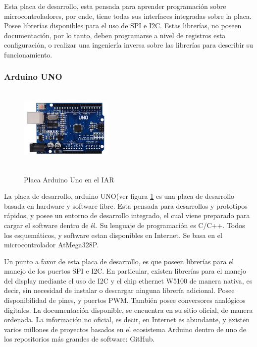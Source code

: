 Esta placa de desarrollo, esta pensada para aprender programación sobre microcontroladores, por ende, tiene todas sus interfaces integradas sobre la placa. Posee librerías disponibles para el uso de SPI e I2C. Estas librerías, no poseen documentación, por lo tanto, deben programarse a nivel de registros esta configuración, o realizar una ingeniería inversa sobre las librerías para describir su funcionamiento.    
\vspace{-3mm}

\subsubsection{Arduino UNO }
\vspace{-5mm}
\begin{figure}
	\caption{Placa Arduino Uno en el IAR}
	\includegraphics[width=0.4\textwidth , height=  40mm]{arduino_uno}
	\label{fig:arduino_uno}	
\end{figure}




La placa de desarrollo, arduino UNO(ver figura \ref{fig:arduino_uno} es una placa de desarrollo basada en hardware y software libre. Esta pensada para desarrollos y prototipos rápidos, y posee un entorno de desarrollo integrado, el cual viene preparado para cargar el software dentro de él. Su lenguaje de programación es C/C++. Todos los esquemáticos, y software estan disponibles en Internet. Se basa en el microcontrolador AtMega328P.  

Un punto a favor de esta placa de desarrollo, es que poseen librerías para el manejo de los puertos SPI e I2C. En particular, existen librerías para el manejo del display mediante el uso de I2C y el chip ethernet W5100 de manera nativa, es decir, sin necesidad de instalar o descargar ninguna librería adicional. Posee disponibilidad de pines,  y puertos PWM. También posee conversores analógicos digitales. La documentación disponible, se encuentra en su sitio oficial, de manera ordenada. 
La información no oficial, es decir, en Internet es abundante, y existen varios millones de proyectos basados en el ecosistema Arduino dentro de uno de los repositorios más grandes de software: GitHub.    

